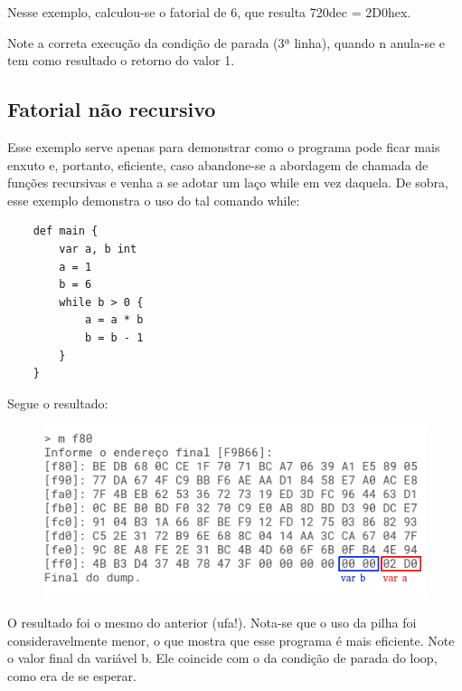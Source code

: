 \documentclass[a4paper,12pt]{report}
\begin{document}
    Nesse exemplo, calculou-se o fatorial de 6, que resulta 720dec = 2D0hex.

    Note a correta execução da condição de parada (3ª linha), quando n anula-se e tem como resultado o retorno do valor 1.
    
    \subsection*{Fatorial não recursivo}
    Esse exemplo serve apenas para demonstrar como o programa pode ficar mais enxuto e, portanto, eficiente, caso abandone-se a abordagem de chamada de funções recursivas e venha a se adotar um laço while em vez daquela. De sobra, esse exemplo demonstra o uso do tal comando while:

    \begin{lstlisting}
    def main {
        var a, b int
        a = 1
        b = 6
        while b > 0 {
            a = a * b
            b = b - 1
        }
    }
    \end{lstlisting}

    Segue o resultado:

    \begin{figure}[h]
        \centering
        \includegraphics[scale=0.65]{fat_while}
    \end{figure}

    O resultado foi o mesmo do anterior (ufa!). Nota-se que o uso da pilha foi consideravelmente menor, o que mostra que esse programa é mais eficiente. Note o valor final da variável b. Ele coincide com o da condição de parada do loop, como era de se esperar.
    
    
\end{document}
